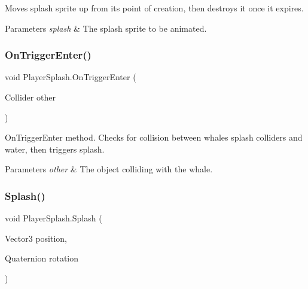 Moves splash sprite up from its point of creation, then destroys it once it expires. 
\begin{DoxyParams}{Parameters}
{\em splash} & The splash sprite to be animated.\\
\hline
\end{DoxyParams}


\mbox{\label{class_player_splash_a19c86b6b926d2d274e54ed300fc0233f}} 
\subsubsection{\texorpdfstring{On\+Trigger\+Enter()}{OnTriggerEnter()}}
{\footnotesize\ttfamily void Player\+Splash.\+On\+Trigger\+Enter (\begin{DoxyParamCaption}\item[{Collider}]{other }\end{DoxyParamCaption})\hspace{0.3cm}{\ttfamily [private]}}



On\+Trigger\+Enter method. Checks for collision between whale\textquotesingle{}s splash colliders and water, then triggers splash. 
\begin{DoxyParams}{Parameters}
{\em other} & The object colliding with the whale.\\
\hline
\end{DoxyParams}


\mbox{\label{class_player_splash_a15b0ea50799fed0ddbc77b61fbc268f1}} 
\subsubsection{\texorpdfstring{Splash()}{Splash()}}
{\footnotesize\ttfamily void Player\+Splash.\+Splash (\begin{DoxyParamCaption}\item[{Vector3}]{position,  }\item[{Quaternion}]{rotation }\end{DoxyParamCaption})\hspace{0.3cm}{\ttfamily [private]}}



